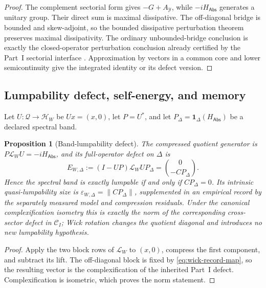 \documentclass[11pt]{article}
\numberwithin{section}{part}
\theoremstyle{plain}
\newtheorem{proposition}[proposition]{Proposition}
\theoremstyle{definition}
\theoremstyle{remark}
\newcommand{\Abs}{\mathsf{Abs}}
\begin{document}
\begin{proof}
The complement sectorial form gives \(-G+A_{\mathcal Y}\), while
\(-iH_{\Abs}\) generates a unitary group.  Their direct sum is maximal
dissipative.  The off-diagonal bridge is bounded and skew-adjoint, so the
bounded dissipative perturbation theorem preserves maximal dissipativity.
The ordinary unbounded-bridge conclusion is exactly the closed-operator
perturbation conclusion already certified by the Part~I sectorial interface
\citep{Kato1995,Ouhabaz2005}.  Approximation by vectors in a common core and
lower semicontinuity give the integrated identity or its defect version.
\end{proof}

\subsection{Lumpability defect, self-energy, and memory}
\label{subsec:wick-feshbach-memory}

Let \(U:\mathcal Q\to\mathcal H_W\) be \(Ux=(x,0)\), let
\(P=U^*\), and let \(P_\Delta=\mathbf1_\Delta(H_{\Abs})\) be a declared
spectral band.

\begin{proposition}[Band-lumpability defect]
\label{prop:wick-band-lumpability}
The compressed quotient generator is
\(P\mathcal L_WU=-iH_{\Abs}\), and its full-operator defect on \(\Delta\)
is
\begin{equation}
 \label{eq:wick-band-defect}
 E_{W,\Delta}
 :=(I-UP)\mathcal L_WUP_\Delta
 =\binom{0}{-CP_\Delta}.
\end{equation}
Hence the spectral band is exactly lumpable if and only if
\(CP_\Delta=0\).  Its intrinsic quasi-lumpability size is
\(\varepsilon_{W,\Delta}=\|CP_\Delta\|\), supplemented in an empirical
record by the separately measured model and compression residuals.  Under
the canonical complexification isometry this is exactly the norm of the
corresponding cross-sector defect in \(\mathscr C_I\); Wick rotation changes
the quotient diagonal and introduces no new lumpability hypothesis.
\end{proposition}

\begin{proof}
Apply the two block rows of \(\mathcal L_W\) to \((x,0)\), compress the
first component, and subtract its lift.  The off-diagonal block is fixed by
\eqref{eq:wick-record-map}, so the resulting vector is the complexification
of the inherited Part~I defect.  Complexification is isometric, which proves
the norm statement.
\end{proof}
\end{document}

